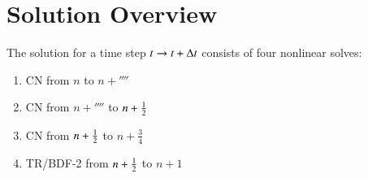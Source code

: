 \section{Solution Overview}
The solution for a time step $t\rightarrow t+\Delta t$ consists of four nonlinear
solves:

\begin{enumerate}
  \item CN from $n$ to $n+\fourth$
  \item CN from $n+\fourth$ to $n+\frac{1}{2}$
  \item CN from $n+\frac{1}{2}$ to $n+\frac{3}{4}$
  \item TR/BDF-2 from $n+\frac{1}{2}$ to $n+1$
\end{enumerate}

